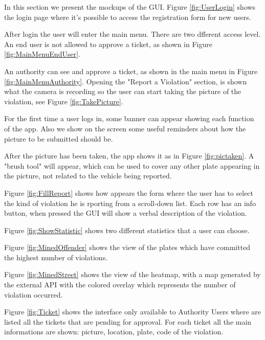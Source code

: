 In this section we present the mockups of the GUI.
Figure \ref{fig:UserLogin} shows the login page where it's possible to access the registration form for new users.

After login the user will enter the main menu. There are two dfferent access level. An end user is not allowed to approve a ticket, as shown in Figure \ref{fig:MainMenuEndUser}.

An authority can see and approve a ticket, as shown in the main menu in Figure \ref{fig:MainMenuAuthority}. Opening the "Report a Violation" section, is shown what the camera is recording so the user can start taking the picture of the violation, see Figure \ref{fig:TakePicture}.

For the first time a user logs in, some banner can appear showing each function of the app. Also we show on the screen some useful reminders about how the picture to be submitted should be.

After the picture has been taken, the app shows it as in Figure \ref{fig:pictaken}. A "brush tool" will appear, which can be used to cover any other plate appearing in the picture, not related to the vehicle being reported.

Figure \ref{fig:FillReport} shows how appears the form where the user has to select the kind of violation he is rporting from a scroll-down list. Each row has an info button, when pressed the GUI will show a verbal description of the violation.

Figure \ref{fig:ShowStatistic} shows two different statistics that a user can choose.

Figure \ref{fig:MinedOffender} shows the view of the plates which have committed the highest number of violations.

Figure \ref{fig:MinedStreet} shows the view of the heatmap, with a map generated by the external API with the colored overlay which represents the number of violation occurred.

Figure \ref{fig:Ticket} shows the interface only available to Authority Users where are listed all the tickets that are pending for approval. For each ticket all the main informations are shown: picture, location, plate, code of the violation.

